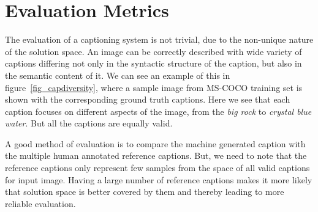 \section{Evaluation Metrics} \label{sec:EvaluationMetrics} The evaluation of a
captioning system is not trivial, due to the non-unique nature of the
solution space.
An image can be correctly described with wide variety of captions differing not
only in the syntactic structure of the caption, but also in the semantic content
of it.
We can see an example of this in figure~\ref{fig_capdiversity}, where a sample
image from MS-COCO training set is shown with the corresponding ground truth
captions.
Here we see that each caption focuses on different aspects of the image, from
the \emph{big rock} to \emph{crystal blue water}.
But all the captions are equally valid.

A good method of evaluation is to compare the machine generated caption with
the multiple human annotated reference captions.
But, we need to note that the reference captions only represent few samples from
the space of all valid captions for input image.
Having a large number of reference captions makes it more likely that solution space is
better covered by them and thereby leading to more reliable evaluation.

